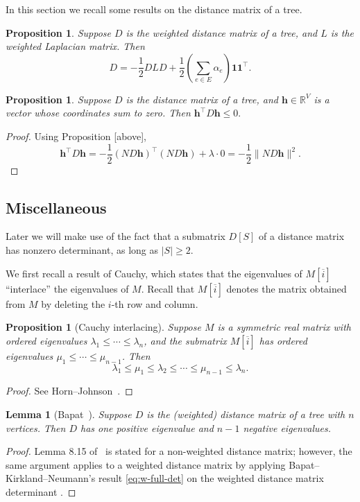 \documentclass{amsart}
\newtheorem{prop}[thm]{Proposition}
\newtheorem{lem}[thm]{Lemma}
\theoremstyle{definition}
\newcommand{\RR}{\mathbb{R}}
\newcommand{\bone}{\mathbf{1}}
\newcommand{\tr}{\intercal}
\begin{document}
In this section we recall some results on the distance matrix of a tree.

\begin{prop}
Suppose $D$ is the weighted distance matrix of a tree, and $L$ is the weighted Laplacian matrix. 
Then
\[
	D = - \frac{1}{2} DLD + \frac{1}{2} \left( \sum_{e \in E} \alpha_e\right) \bone \bone^\tr .
\]
\end{prop}


\begin{prop}
\label{prop:det-hyperplane}
Suppose $D$ is the distance matrix of a tree, and $\mathbf{h} \in \RR^V$ is a vector whose coordinates sum to zero. 
Then
$
	\mathbf{h}^\tr D \mathbf{h} \leq 0.
$
\end{prop}
\begin{proof}
Using Proposition [above],
\[
	\mathbf{h}^\tr D\mathbf{h} = - \frac12 (ND\mathbf{h})^\tr (ND\mathbf{h}) + \lambda \cdot 0
	= -\frac12 \| ND \mathbf{h} \|^2 .
\]
\end{proof}

\subsection{Miscellaneous}

Later we will make use of the fact that a submatrix $D[S]$ of a distance matrix has nonzero determinant, as long as $|S| \geq 2$.

We first recall a result of Cauchy, which states that the eigenvalues of $M[\overline{i}]$ ``interlace'' the eigenvalues of $M$.
Recall that $M[\overline{i}]$ denotes the matrix obtained from $M$ by deleting the $i$-th row and column.

\begin{prop}[Cauchy interlacing]
\label{prop:cauchy-interlacing}
Suppose $M$ is a symmetric real matrix 
with ordered eigenvalues $\lambda_1 \leq \cdots \leq \lambda_n$, 
and  the submatrix $M[\overline{i}]$ has ordered eigenvalues $\mu_1 \leq \cdots \leq \mu_{n-1}$.
Then
\[
	\lambda_1 \leq \mu_1 \leq \lambda_2 \leq \cdots \leq \mu_{n-1} \leq \lambda_n.
\]
\end{prop}
\begin{proof}
See Horn--Johnson~\cite[Theorem 4.3.17]{horn-johnson}.
\end{proof}

\begin{lem}[{Bapat~\cite[Lemma 8.15]{bapat}}]
\label{lem:dist-signature}
Suppose $D$ is the (weighted) distance matrix of a tree with $n$ vertices. 
Then $D$ has one positive eigenvalue and $n - 1$ negative eigenvalues.
\end{lem}
\begin{proof}
Lemma 8.15 of~\cite{bapat} is stated for a non-weighted distance matrix;
however, the same argument applies to a weighted distance matrix by applying Bapat--Kirkland--Neumann's result \eqref{eq:w-full-det} on the weighted distance matrix determinant \cite[Corollary 2.5]{bapat-kirkland-neumann}. 
\end{proof}
\end{document}
